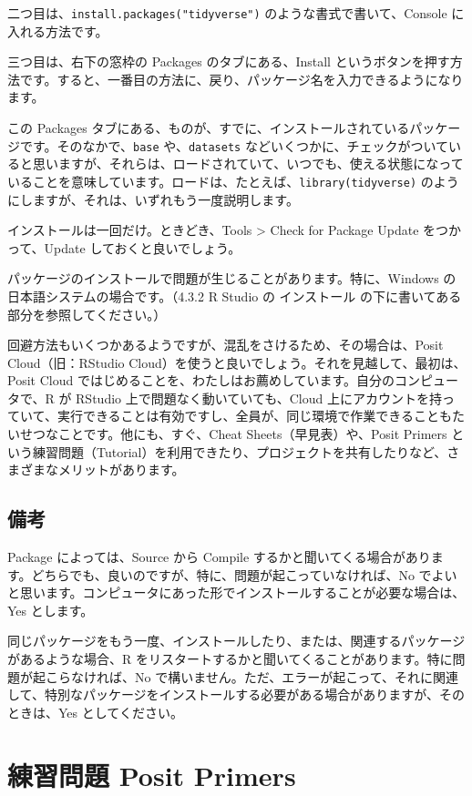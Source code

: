 \documentclass[
  xelatex, ja=standard]{bxjsbook}
\theoremstyle{definition}
\theoremstyle{definition}
\theoremstyle{definition}
\theoremstyle{definition}
\theoremstyle{remark}
\begin{document}
二つ目は、\texttt{install.packages("tidyverse")} のような書式で書いて、Console に入れる方法です。

三つ目は、右下の窓枠の Packages のタブにある、Install というボタンを押す方法です。すると、一番目の方法に、戻り、パッケージ名を入力できるようになります。

この Packages タブにある、ものが、すでに、インストールされているパッケージです。そのなかで、\texttt{base} や、\texttt{datasets} などいくつかに、チェックがついていると思いますが、それらは、ロードされていて、いつでも、使える状態になっていることを意味しています。ロードは、たとえば、\texttt{library(tidyverse)} のようにしますが、それは、いずれもう一度説明します。

インストールは一回だけ。ときどき、Tools \textgreater{} Check for Package Update をつかって、Update しておくと良いでしょう。

パッケージのインストールで問題が生じることがあります。特に、Windows の日本語システムの場合です。（4.3.2 R Studio の インストール の下に書いてある部分を参照してください。）

回避方法もいくつかあるようですが、混乱をさけるため、その場合は、Posit Cloud（旧：RStudio Cloud）を使うと良いでしょう。それを見越して、最初は、Posit Cloud ではじめることを、わたしはお薦めしています。自分のコンピュータで、R が RStudio 上で問題なく動いていても、Cloud 上にアカウントを持っていて、実行できることは有効ですし、全員が、同じ環境で作業できることもたいせつなことです。他にも、すぐ、Cheat Sheets（早見表）や、Posit Primers という練習問題（Tutorial）を利用できたり、プロジェクトを共有したりなど、さまざまなメリットがあります。

\hypertarget{ux5099ux8003}{%
\subsection{備考}\label{ux5099ux8003}}

Package によっては、Source から Compile するかと聞いてくる場合があります。どちらでも、良いのですが、特に、問題が起こっていなければ、No でよいと思います。コンピュータにあった形でインストールすることが必要な場合は、Yes とします。

同じパッケージをもう一度、インストールしたり、または、関連するパッケージがあるような場合、R をリスタートするかと聞いてくることがあります。特に問題が起こらなければ、No で構いません。ただ、エラーが起こって、それに関連して、特別なパッケージをインストールする必要がある場合がありますが、そのときは、Yes としてください。

\hypertarget{ux7df4ux7fd2ux554fux984c-posit-primers}{%
\section{練習問題 Posit Primers}\label{ux7df4ux7fd2ux554fux984c-posit-primers}}
\end{document}
